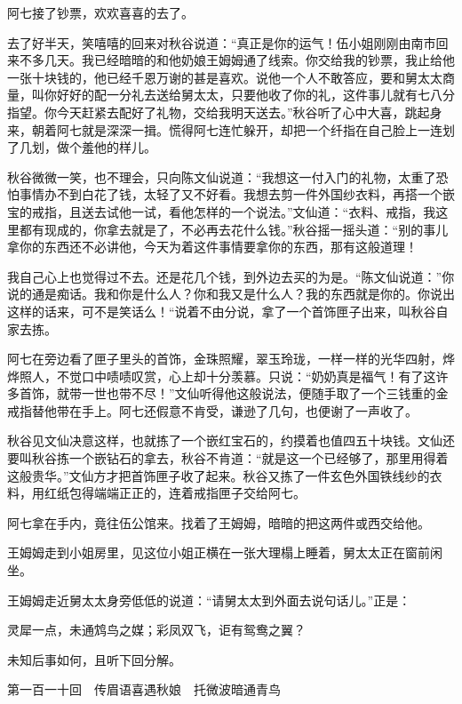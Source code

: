 \documentclass[12pt,UTF8]{ctexbook}
\begin{document}
{{{阿七接了钞票，欢欢喜喜的去了。

去了好半天，笑嘻嘻的回来对秋谷说道：“真正是你的运气！伍小姐刚刚由南市回来不多几天。我已经暗暗的和他奶娘王姆姆通了线索。你交给我的钞票，我止给他一张十块钱的，他已经千恩万谢的甚是喜欢。说他一个人不敢答应，要和舅太太商量，叫你好好的配一分礼去送给舅太太，只要他收了你的礼，这件事儿就有七八分指望。你今天赶紧去配好了礼物，交给我明天送去。”秋谷听了心中大喜，跳起身来，朝着阿七就是深深一揖。慌得阿七连忙躲开，却把一个纤指在自己脸上一连划了几划，做个羞他的样儿。

秋谷微微一笑，也不理会，只向陈文仙说道：“我想这一付入门的礼物，太重了恐怕事情办不到白花了钱，太轻了又不好看。我想去剪一件外国纱衣料，再搭一个嵌宝的戒指，且送去试他一试，看他怎样的一个说法。”文仙道：“衣料、戒指，我这里都有现成的，你拿去就是了，不必再去花什么钱。”秋谷摇一摇头道：“别的事儿拿你的东西还不必讲他，今天为着这件事情要拿你的东西，那有这般道理！

我自己心上也觉得过不去。还是花几个钱，到外边去买的为是。“陈文仙说道：”你说的通是痴话。我和你是什么人？你和我又是什么人？我的东西就是你的。你说出这样的话来，可不是笑话么！“说着不由分说，拿了一个首饰匣子出来，叫秋谷自家去拣。

阿七在旁边看了匣子里头的首饰，金珠照耀，翠玉玲珑，一样一样的光华四射，烨烨照人，不觉口中啧啧叹赏，心上却十分羡慕。只说：“奶奶真是福气！有了这许多首饰，就带一世也带不尽！”文仙听得他这般说法，便随手取了一个三钱重的金戒指替他带在手上。阿七还假意不肯受，谦逊了几句，也便谢了一声收了。

秋谷见文仙决意这样，也就拣了一个嵌红宝石的，约摸着也值四五十块钱。文仙还要叫秋谷拣一个嵌钻石的拿去，秋谷不肯道：“就是这一个已经够了，那里用得着这般贵华。”文仙方才把首饰匣子收了起来。秋谷又拣了一件玄色外国铁线纱的衣料，用红纸包得端端正正的，连着戒指匣子交给阿七。

阿七拿在手内，竟往伍公馆来。找着了王姆姆，暗暗的把这两件或西交给他。

王姆姆走到小姐房里，见这位小姐正横在一张大理榻上睡着，舅太太正在窗前闲坐。

王姆姆走近舅太太身旁低低的说道：“请舅太太到外面去说句话儿。”正是：

灵犀一点，未通鸩鸟之媒；彩凤双飞，讵有鸳鸯之翼？

未知后事如何，且听下回分解。





第一百一十回　传眉语喜遇秋娘　托微波暗通青鸟





}}}
\end{document}
